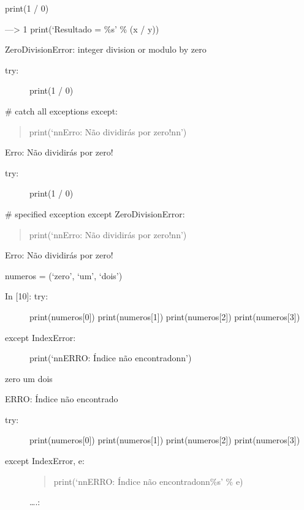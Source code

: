 \documentclass[letterpaper,10pt,brazil]{sphinxmanual}
\begin{document}
print(1 / 0)

—\sphinxhyphen{}\textgreater{} 1 print(‘Resultado = \%s’ \% (x / y))

ZeroDivisionError: integer division or modulo by zero
\begin{description}
\item[{try:}] \leavevmode
print(1 / 0)

\end{description}

\# catch all exceptions
except:
\begin{quote}

print(‘nnErro: Não dividirás por zero!nn’)
\end{quote}

Erro: Não dividirás por zero!
\begin{description}
\item[{try:}] \leavevmode
print(1 / 0)

\end{description}

\# specified exception
except ZeroDivisionError:
\begin{quote}

print(‘nnErro: Não dividirás por zero!nn’)
\end{quote}

Erro: Não dividirás por zero!

numeros = (‘zero’, ‘um’, ‘dois’)
\begin{description}
\item[{In {[}10{]}: try:}] \leavevmode
print(numeros{[}0{]})
print(numeros{[}1{]})
print(numeros{[}2{]})
print(numeros{[}3{]})

\item[{except IndexError:}] \leavevmode
print(‘nnERRO: Índice não encontradonn’)

\end{description}

zero
um
dois

ERRO: Índice não encontrado
\begin{description}
\item[{try:}] \leavevmode
print(numeros{[}0{]})
print(numeros{[}1{]})
print(numeros{[}2{]})
print(numeros{[}3{]})

\item[{except IndexError, e:}] \leavevmode\begin{quote}

print(‘nnERRO: Índice não encontradonn\%s’ \% e)
\end{quote}

….:

\end{description}
\end{document}
